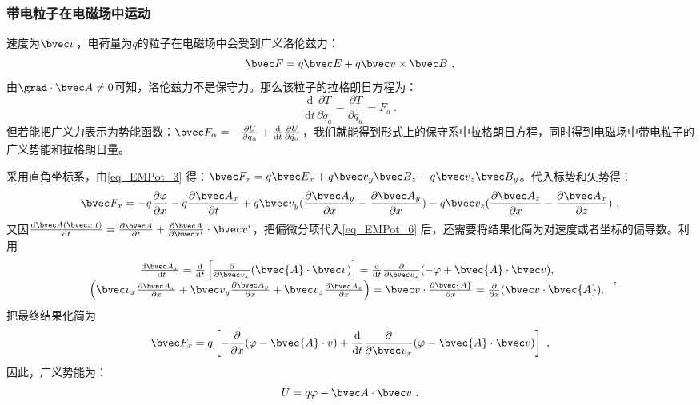 \subsubsection{带电粒子在电磁场中运动}
速度为$\bvec v$，电荷量为$q$的粒子在电磁场中会受到广义洛伦兹力：
\begin{equation}\label{eq_EMPot_3}
\bvec F=q\bvec E+q\bvec v \times \bvec B
~,\end{equation}
由$\grad \cdot \bvec A\neq 0$可知，洛伦兹力不是保守力。那么该粒子的拉格朗日方程为：
\begin{equation}
\frac{\mathrm{d}}{\mathrm{d} t} \frac{\partial T}{\partial \dot{q}_a}-\frac{\partial T}{\partial q_a}=F_a~.
\end{equation}
但若能把广义力表示为势能函数：$\bvec F_{\alpha}=-\frac{\partial U}{\partial q_{\alpha}}+\frac{\mathrm{d}}{\mathrm{d}t}\frac{\partial U}{\partial \dot q_{\alpha}}$，我们就能得到形式上的保守系中拉格朗日方程，同时得到电磁场中带电粒子的广义势能和拉格朗日量。

采用直角坐标系，由\autoref{eq_EMPot_3} 得：$\bvec F_x=q\bvec E_x+q\bvec v_y\bvec B_z-q\bvec v_z\bvec B_y$。代入标势和矢势得：
\begin{equation}\label{eq_EMPot_6}
\bvec F_x=-q\frac{\partial \varphi}{\partial x}-q\frac{\partial \bvec A_x}{\partial t}+q\bvec v_y(\frac{\partial \bvec A_y}{\partial x}-\frac{\partial \bvec A_y}{\partial x})-q\bvec v_z(\frac{\partial \bvec A_z}{\partial x}-\frac{\partial \bvec A_x}{\partial z})~,
\end{equation}
又因$\frac{\mathrm{d}\bvec A(\bvec x,t)}{\mathrm{d}t}=\frac{\partial \bvec A}{\partial t}+\frac{\partial \bvec A}{\partial \bvec x^i}\cdot \bvec v^i$，把偏微分项代入\autoref{eq_EMPot_6} 后，还需要将结果化简为对速度或者坐标的偏导数。利用
\begin{equation}
\begin{array}{c}
\frac{\mathrm{d} \bvec A_x}{\mathrm{~d} t}=\frac{\mathrm{d}}{\mathrm{d} t}\left[\frac{\partial}{\partial \bvec v_x}(\bvec {A} \cdot \bvec v)\right]=\frac{\mathrm{d}}{\mathrm{d} t} \frac{\partial}{\partial \bvec v_x}(-\varphi+\bvec {A} \cdot \bvec v), \\
\left(\bvec v_x \frac{\partial \bvec A_x}{\partial x}+\bvec v_y \frac{\partial \bvec A_y}{\partial x}+\bvec v_z \frac{\partial \bvec A_z}{\partial x}\right)=\bvec v \cdot \frac{\partial \bvec {A}}{\partial x}=\frac{\partial}{\partial x}(\bvec v \cdot \bvec {A}) .
\end{array}~,
\end{equation}
把最终结果化简为
\begin{equation}
\bvec F_x=q\left[-\frac{\partial}{\partial x}(\varphi-\bvec {A} \cdot v)+\frac{\mathrm{d}}{\mathrm{d} t} \frac{\partial}{\partial \bvec v_x}(\varphi-\bvec {A} \cdot \bvec v)\right]~,
\end{equation}
因此，广义势能为：
\begin{equation}
U=q\varphi -\bvec A\cdot \bvec v~.
\end{equation}